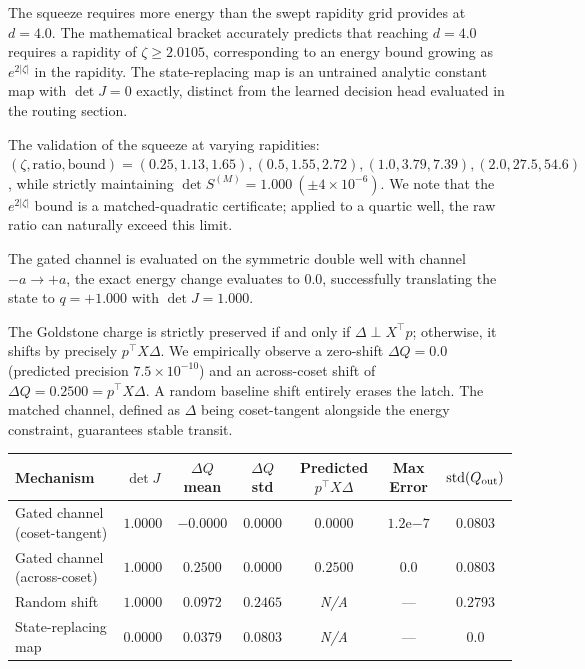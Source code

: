 \documentclass{article}
\newcommand{\detJ}{\det J}
\begin{document}
The squeeze requires more energy than the swept rapidity grid provides at $d=4.0$. The mathematical bracket accurately predicts that reaching $d=4.0$ requires a rapidity of $\zeta\ge2.0105$, corresponding to an energy bound growing as $e^{2|\zeta|}$ in the rapidity. The state-replacing map is an untrained analytic constant map with $\detJ=0$ exactly, distinct from the learned decision head evaluated in the routing section.

The validation of the squeeze at varying rapidities: $(\zeta,\text{ratio},\text{bound})=(0.25,1.13,1.65), (0.5,1.55,2.72), (1.0,3.79,7.39), (2.0,27.5,54.6)$, while strictly maintaining $\det S^{(M)}=1.000\ (\pm4\times10^{-6})$. We note that the $e^{2|\zeta|}$ bound is a matched-quadratic certificate; applied to a quartic well, the raw ratio can naturally exceed this limit.

The gated channel is evaluated on the symmetric double well with channel $-a\to+a$, the exact energy change evaluates to $0.0$, successfully translating the state to $q=+1.000$ with $\detJ=1.000$.

The Goldstone charge is strictly preserved if and only if $\Delta\perp X^\top p$; otherwise, it shifts by precisely $p^\top X\Delta$. We empirically observe a zero-shift $\Delta Q=0.0$ (predicted precision $7.5\times10^{-10}$) and an across-coset shift of $\Delta Q=0.2500=p^\top X\Delta$. A random baseline shift entirely erases the latch. The matched channel, defined as $\Delta$ being coset-tangent alongside the energy constraint, guarantees stable transit.

\begin{center}\footnotesize
\begin{tabular}{lcccccc}
\toprule
Mechanism & $\detJ$ & $\Delta Q$ mean & $\Delta Q$ std & Predicted $p^\top X\Delta$ & Max Error & $\mathrm{std}(Q_{\rm out})$ \\
\midrule
Gated channel (coset-tangent) & $1.0000$ & $-0.0000$ & $0.0000$ & $0.0000$ & $1.2\mathrm{e}{-7}$ & $0.0803$ \\
Gated channel (across-coset) & $1.0000$ & $0.2500$ & $0.0000$ & $0.2500$ & $0.0$ & $0.0803$ \\
Random shift & $1.0000$ & $0.0972$ & $0.2465$ & \emph{N/A} & --- & $0.2793$ \\
State-replacing map & $0.0000$ & $0.0379$ & $0.0803$ & \emph{N/A} & --- & $0.0$ \\
\bottomrule
\end{tabular}
\end{center}
\end{document}
